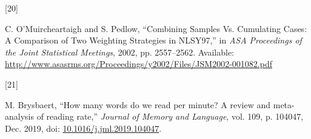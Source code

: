\documentclass{IEEEcsmag}
\newlength{\cslhangindent}
\newlength{\csllabelwidth}
\newenvironment{CSLReferences}[2] %
 {\begin{list}{}{%
  \setlength{\itemindent}{0pt}
  \setlength{\leftmargin}{0pt}
  \setlength{\parsep}{0pt}
  \ifodd #1
   \setlength{\leftmargin}{\cslhangindent}
   \setlength{\itemindent}{-1\cslhangindent}
  \fi
  \setlength{\itemsep}{#2\baselineskip}}}
 {\end{list}}
\newcommand{\CSLLeftMargin}[1]{\parbox[t]{\csllabelwidth}{#1}}
\newcommand{\CSLRightInline}[1]{\parbox[t]{\linewidth - \csllabelwidth}{#1}\break}
\begin{document}
\begin{CSLReferences}{0}{0}
\CSLLeftMargin{{[}20{]} }%
\CSLRightInline{C. O'Muircheartaigh and S. Pedlow, {``Combining {Samples Vs}. {Cumulating Cases}: {A Comparison} of {Two Weighting Strategies} in {NLSY97},''} in \emph{{ASA Proceedings} of the {Joint Statistical Meetings}}, 2002, pp. 2557--2562. Available: \url{http://www.asasrms.org/Proceedings/y2002/Files/JSM2002-001082.pdf}}

\CSLLeftMargin{{[}21{]} }%
\CSLRightInline{M. Brysbaert, {``How many words do we read per minute? {A} review and meta-analysis of reading rate,''} \emph{Journal of Memory and Language}, vol. 109, p. 104047, Dec. 2019, doi: \href{https://doi.org/10.1016/j.jml.2019.104047}{10.1016/j.jml.2019.104047}.}

\end{CSLReferences}
% 
% 
% 
% 
% 
% 
% 
% 
\end{document}
